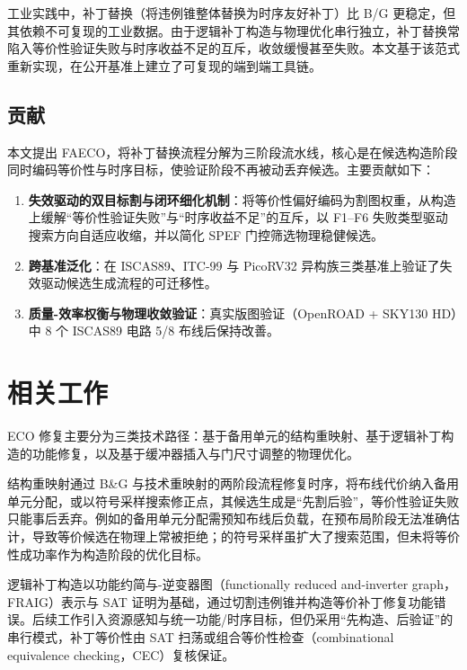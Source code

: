 \documentclass[journal]{IEEEtran}
\begin{document}
工业实践中，补丁替换（将违例锥整体替换为时序友好补丁）比 B/G 更稳定，但其依赖不可复现的工业数据。由于逻辑补丁构造与物理优化串行独立，补丁替换常陷入等价性验证失败与时序收益不足的互斥，收敛缓慢甚至失败。本文基于该范式重新实现，在公开基准上建立了可复现的端到端工具链。

\subsection{贡献}

本文提出 FAECO，将补丁替换流程分解为三阶段流水线，核心是在候选构造阶段同时编码等价性与时序目标，使验证阶段不再被动丢弃候选。主要贡献如下：

\begin{enumerate}
  \item \textbf{失效驱动的双目标割与闭环细化机制}：将等价性偏好编码为割图权重，从构造上缓解“等价性验证失败”与“时序收益不足”的互斥，以 F1--F6 失败类型驱动搜索方向自适应收缩，并以简化 SPEF 门控筛选物理稳健候选。
  \item \textbf{跨基准泛化}：在 ISCAS89、ITC-99 与 PicoRV32 异构族三类基准上验证了失效驱动候选生成流程的可迁移性。
  \item \textbf{质量-效率权衡与物理收敛验证}：真实版图验证（OpenROAD + SKY130 HD）中 8 个 ISCAS89 电路 5/8 布线后保持改善。
\end{enumerate}

\section{相关工作}

ECO 修复主要分为三类技术路径：基于备用单元的结构重映射、基于逻辑补丁构造的功能修复，以及基于缓冲器插入与门尺寸调整的物理优化。

结构重映射通过 B\&G 与技术重映射的两阶段流程修复时序，将布线代价纳入备用单元分配\cite{ho2010eco,ho2012treco}，或以符号采样搜索修正点\cite{kravets2019symbolic}，其候选生成是“先割后验”，等价性验证失败只能事后丢弃。例如\cite{ho2010eco}的备用单元分配需预知布线后负载，在预布局阶段无法准确估计，导致等价候选在物理上常被拒绝；\cite{kravets2019symbolic}的符号采样虽扩大了搜索范围，但未将等价性成功率作为构造阶段的优化目标。

逻辑补丁构造以功能约简与-逆变器图（functionally reduced and-inverter graph，FRAIG）表示与 SAT 证明为基础，通过切割违例锥并构造等价补丁修复功能错误\cite{jiang2010fraig,jiang2016resource}。后续工作引入资源感知\cite{jiang2016resource}与统一功能/时序目标\cite{lin2011simult,luo2016unified}，但仍采用“先构造、后验证”的串行模式，补丁等价性由 SAT 扫荡或组合等价性检查（combinational equivalence checking，CEC）复核保证\cite{mishchenko2006sat,zhong2024stp}。
\end{document}
